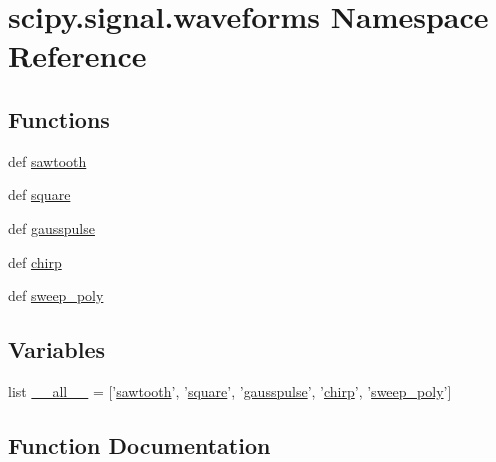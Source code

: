 \hypertarget{namespacescipy_1_1signal_1_1waveforms}{}\section{scipy.\+signal.\+waveforms Namespace Reference}
\label{namespacescipy_1_1signal_1_1waveforms}
\subsection*{Functions}
\begin{DoxyCompactItemize}
\item 
def \hyperlink{namespacescipy_1_1signal_1_1waveforms_ab5cef3b7cfe136f25a6bcfe8ccc3067f}{sawtooth}
\item 
def \hyperlink{namespacescipy_1_1signal_1_1waveforms_a6c3861d26caf4bbff35844a01bbfcbb5}{square}
\item 
def \hyperlink{namespacescipy_1_1signal_1_1waveforms_a90ac6ff20bb92b51929cad862189cd64}{gausspulse}
\item 
def \hyperlink{namespacescipy_1_1signal_1_1waveforms_a88f8ddd93e309de7ef53ad742433b9a6}{chirp}
\item 
def \hyperlink{namespacescipy_1_1signal_1_1waveforms_a4c86637f31e3b2ac29119a7a558e8de7}{sweep\+\_\+poly}
\end{DoxyCompactItemize}
\subsection*{Variables}
\begin{DoxyCompactItemize}
\item 
list \hyperlink{namespacescipy_1_1signal_1_1waveforms_a16ac485e01290339aabd90fa3e6f1cb5}{\+\_\+\+\_\+all\+\_\+\+\_\+} = \mbox{[}'\hyperlink{namespacescipy_1_1signal_1_1waveforms_ab5cef3b7cfe136f25a6bcfe8ccc3067f}{sawtooth}', '\hyperlink{namespacescipy_1_1signal_1_1waveforms_a6c3861d26caf4bbff35844a01bbfcbb5}{square}', '\hyperlink{namespacescipy_1_1signal_1_1waveforms_a90ac6ff20bb92b51929cad862189cd64}{gausspulse}', '\hyperlink{namespacescipy_1_1signal_1_1waveforms_a88f8ddd93e309de7ef53ad742433b9a6}{chirp}', '\hyperlink{namespacescipy_1_1signal_1_1waveforms_a4c86637f31e3b2ac29119a7a558e8de7}{sweep\+\_\+poly}'\mbox{]}
\end{DoxyCompactItemize}


\subsection{Function Documentation}
\hypertarget{namespacescipy_1_1signal_1_1waveforms_a88f8ddd93e309de7ef53ad742433b9a6}{}
